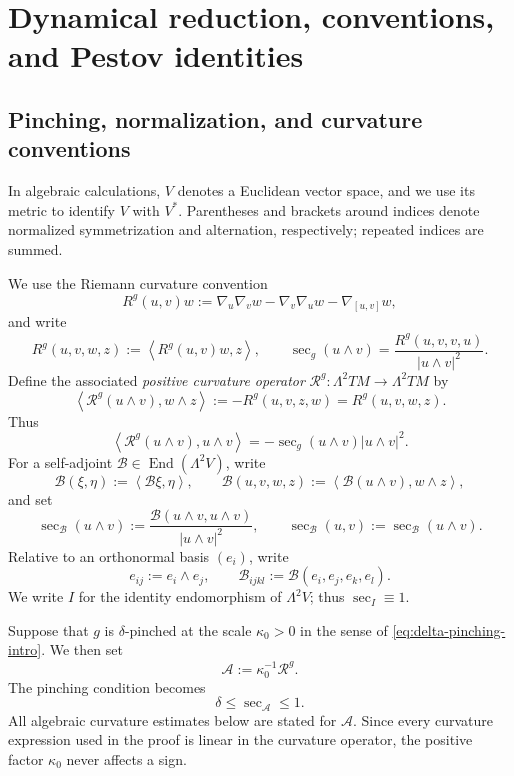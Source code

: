 \documentclass[reqno,11pt]{amsart}
\theoremstyle{definition}
\newcommand{\Rop}{\mathscr R}
\newcommand{\cA}{\mathcal A}
\newcommand{\cB}{\mathcal B}
\newcommand{\End}{\operatorname{End}}
\newcommand{\secg}{\operatorname{sec}_{g}}
\newcommand{\inner}[2]{\left\langle #1,#2\right\rangle}
\begin{document}
\section{Dynamical reduction, conventions, and Pestov identities}\label{sec:preliminaries}

\subsection{Pinching, normalization, and curvature conventions}

In algebraic calculations, $V$ denotes a Euclidean vector space, and we use
its metric to identify $V$ with $V^*$. Parentheses and brackets around
indices denote normalized symmetrization and alternation, respectively;
repeated indices are summed.

We use the Riemann curvature convention
$$
  R^g(u,v)w
  :=\nabla_u\nabla_vw-\nabla_v\nabla_uw-\nabla_{[u,v]}w,
$$
and write
$$
  R^g(u,v,w,z):=\inner{R^g(u,v)w}{z},
  \qquad
  \secg(u\wedge v)
  =\frac{R^g(u,v,v,u)}{|u\wedge v|^2}.
$$
Define the associated \emph{positive curvature operator}
\(
  \Rop^g:\Lambda^2TM\to\Lambda^2TM
\)
by
\begin{equation}\label{eq:Rop-definition}
  \inner{\Rop^g(u\wedge v)}{w\wedge z}
  :=-R^g(u,v,z,w)=R^g(u,v,w,z).
\end{equation}
Thus
\begin{equation*}
  \inner{\Rop^g(u\wedge v)}{u\wedge v}
  =-\secg(u\wedge v)|u\wedge v|^2.
\end{equation*}
For a self-adjoint $\cB\in\End(\Lambda^2V)$, write
$$
  \cB(\xi,\eta):=\inner{\cB\xi}{\eta},
  \qquad
  \cB(u,v,w,z):=\inner{\cB(u\wedge v)}{w\wedge z},
$$
and set
$$
  \sec_{\cB}(u\wedge v)
  :=\frac{\cB(u\wedge v,u\wedge v)}{|u\wedge v|^2},
  \qquad
  \sec_{\cB}(u,v):=\sec_{\cB}(u\wedge v).
$$
Relative to an orthonormal basis $(e_i)$, write
$$
  e_{ij}:=e_i\wedge e_j,
  \qquad
  \cB_{ijkl}:=\cB(e_i,e_j,e_k,e_l).
$$
We write $I$ for the identity endomorphism of $\Lambda^2V$; thus
$\sec_I\equiv1$.

Suppose that $g$ is $\delta$-pinched at the scale $\kappa_0>0$ in the sense
of \eqref{eq:delta-pinching-intro}. We then set
\begin{equation}\label{eq:normalized-curvature}
  \cA:=\kappa_0^{-1}\Rop^g.
\end{equation}
The pinching condition becomes
\begin{equation*}
  \delta\leq\sec_{\cA}\leq1.
\end{equation*}
All algebraic curvature estimates below are stated for $\cA$. Since every
curvature expression used in the proof is linear in the curvature operator,
the positive factor $\kappa_0$ never affects a sign.
\end{document}

